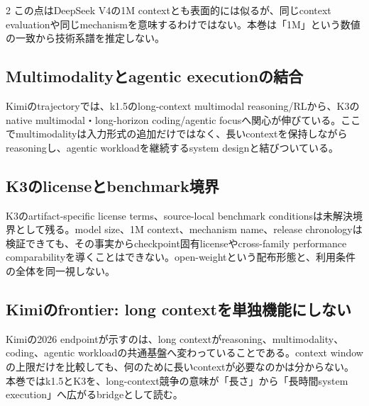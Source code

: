 \documentclass[lualatex,a4paper,10pt]{jlreq}
\begin{document}
\begin{multicols}{2}
この点はDeepSeek V4の1M contextとも表面的には似るが、同じcontext evaluationや同じmechanismを意味するわけではない。本巻は「1M」という数値の一致から技術系譜を推定しない。

\subsection{Multimodalityとagentic executionの結合}
Kimiのtrajectoryでは、k1.5のlong-context multimodal reasoning/RLから、K3のnative multimodal・long-horizon coding/agentic focusへ関心が伸びている。ここでmultimodalityは入力形式の追加だけではなく、長いcontextを保持しながらreasoningし、agentic workloadを継続するsystem designと結びついている。\autocite{kimik15,kimik3}

\subsection{K3のlicenseとbenchmark境界}
K3のartifact-specific license terms、source-local benchmark conditionsは未解決境界として残る。model size、1M context、mechanism name、release chronologyは検証できても、その事実からcheckpoint固有licenseやcross-family performance comparabilityを導くことはできない。open-weightという配布形態と、利用条件の全体を同一視しない。

\subsection{Kimiのfrontier: long contextを単独機能にしない}
Kimiの2026 endpointが示すのは、long contextがreasoning、multimodality、coding、agentic workloadの共通基盤へ変わっていることである。context windowの上限だけを比較しても、何のために長いcontextが必要なのかは分からない。本巻ではk1.5とK3を、long-context競争の意味が「長さ」から「長時間system execution」へ広がるbridgeとして読む。

\end{multicols}

\end{document}
